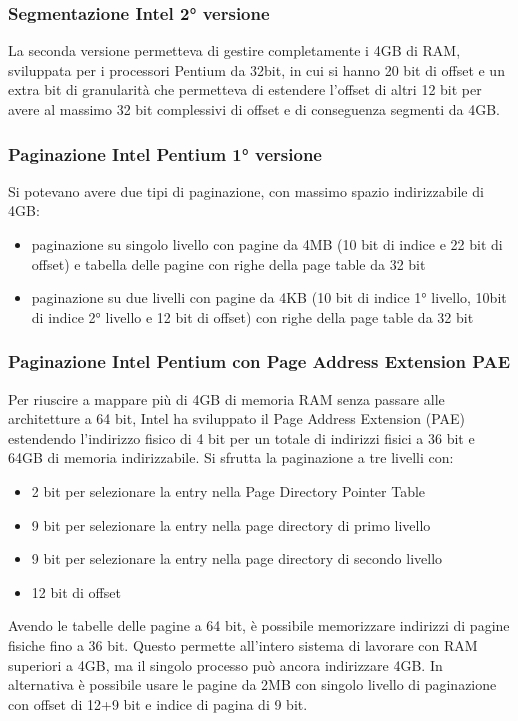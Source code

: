 \documentclass[a4paper]{article}
\begin{document}
\subsubsection*{Segmentazione Intel 2° versione}
La seconda versione permetteva di gestire completamente i 4GB di RAM, sviluppata per i processori Pentium da 32bit, in cui si
hanno 20 bit di offset e un extra bit di granularità che permetteva di estendere l'offset di altri 12 bit per avere al massimo
32 bit complessivi di offset e di conseguenza segmenti da 4GB.

\subsubsection*{Paginazione Intel Pentium 1° versione}
Si potevano avere due tipi di paginazione, con massimo spazio indirizzabile di 4GB:
\begin{itemize}
	\item paginazione su singolo livello con pagine da 4MB (10 bit di indice e 22 bit di offset) e tabella delle pagine con
	righe della page table da 32 bit
	\item paginazione su due livelli con pagine da 4KB (10 bit di indice 1° livello, 10bit di indice 2° livello e 12 bit di
	offset) con righe della page table da 32 bit
\end{itemize}

\subsubsection*{Paginazione Intel Pentium con Page Address Extension PAE}
Per riuscire a mappare più di 4GB di memoria RAM senza passare alle architetture a 64 bit, Intel ha sviluppato il Page Address
Extension (PAE) estendendo l'indirizzo fisico di 4 bit per un totale di indirizzi fisici a 36 bit e 64GB di memoria indirizzabile.
Si sfrutta la paginazione a tre livelli con:
\begin{itemize}
	\item 2 bit per selezionare la entry nella Page Directory Pointer Table
	\item 9 bit per selezionare la entry nella page directory di primo livello
	\item 9 bit per selezionare la entry nella page directory di secondo livello
	\item 12 bit di offset
\end{itemize}
Avendo le tabelle delle pagine a 64 bit, è possibile memorizzare indirizzi di pagine fisiche fino a 36 bit. Questo permette
all'intero sistema di lavorare con RAM superiori a 4GB, ma il singolo processo può ancora indirizzare 4GB. In alternativa
è possibile usare le pagine da 2MB con singolo livello di paginazione con offset di 12+9 bit e indice di pagina di 9 bit.
\end{document}
